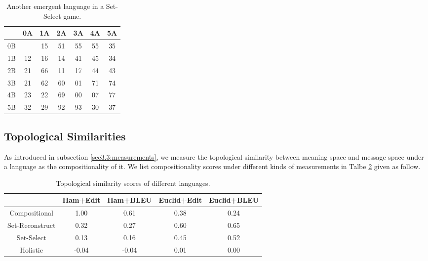 \begin{table}[!h]
    \centering
    \begin{tabular}{|c|c|c|c|c|c|c|}
        \hline
           & 0A & 1A & 2A & 3A & 4A & 5A \\ \hline
        0B &    & 15 & 51 & 55 & 55 & 35 \\ \hline
        1B & 12 & 16 & 14 & 41 & 45 & 34 \\ \hline
        2B & 21 & 66 & 11 & 17 & 44 & 43 \\ \hline
        3B & 21 & 62 & 60 & 01 & 71 & 74 \\ \hline
        4B & 23 & 22 & 69 & 00 & 07 & 77 \\ \hline
        5B & 32 & 29 & 92 & 93 & 30 & 37 \\ \hline
        \end{tabular}
    \caption{Another emergent language in a Set-Select game.}
    \label{tab4.4:emregent_language_referential2}
\end{table}

\subsection{Topological Similarities}
\label{ssec4.2.2:topo_sim}

As introduced in subsection \ref{sec3.3:measurements}, we measure the topological similarity between meaning space and message space under a language as the compositionality of it. We list compositionality scores under different kinds of measurements in Talbe \ref{tab4.4:topo_sim_lans} given as follow.

\begin{table}[!h]
    \centering
    \begin{tabular}{|c|c|c|c|c|}
        \hline
                      & Ham+Edit & Ham+BLEU & Euclid+Edit & Euclid+BLEU \\ \hline
        Compositional & 1.00     & 0.61     & 0.38        & 0.24        \\ \hline
        Set-Reconstruct   & 0.32     & 0.27     & 0.60        & 0.65        \\ \hline
        Set-Select    & 0.13     & 0.16     & 0.45        & 0.52        \\ \hline
        Holistic      & -0.04    & -0.04    & 0.01        & 0.00        \\ \hline
    \end{tabular}
    \caption{Topological similarity scores of different languages.}
    \label{tab4.4:topo_sim_lans}
\end{table}

